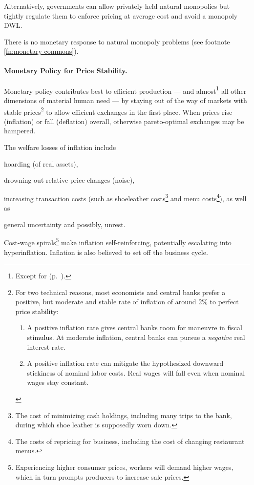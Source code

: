 Alternatively, governments can allow privately held natural monopolies but tightly regulate them to enforce pricing at average cost and avoid a monopoly \gls{DWL}.

There is no monetary response to natural monopoly problems (see footnote \ref{fn:monetary-commons}).

\paragraph{Monetary Policy for Price Stability.}  \label{sec:price-stability} Monetary policy contributes best to efficient production --- and almost\footnote{
	Except for  (p.~\pageref{sec:monetary-stimulus}).}
all other dimensions of material human need --- by staying out of the way of markets with stable prices\footnote{
	For two technical reasons, most economists and central banks prefer a positive, but moderate and stable rate of inflation of around 2\% to perfect price stability:
	\begin{enumerate}
		\item A positive inflation rate gives central banks room for maneuvre in fiscal stimulus. At moderate inflation, central banks can pursue a \emph{negative} real interest rate. 
		\item A positive inflation rate can mitigate the hypothesized downward stickiness of nominal labor costs. Real wages will fall even when nominal wages stay constant.%
	\end{enumerate}} 
to allow efficient exchanges in the first place. When prices rise (inflation) or fall (deflation) overall, otherwise pareto-optimal exchanges may be hampered. 

The welfare losses of inflation include \begin{inparaenum}
	\item hoarding (of real assets), 
	\item drowning out relative price changes (noise), 
	\item increasing transaction costs (such as shoeleather costs\footnote{
		The cost of minimizing cash holdings, including many trips to the bank, during which shoe leather is supposedly worn down.} 
		and menu costs\footnote{
			The costs of repricing for business, including the cost of changing restaurant menus.}), as well as 
	\item general uncertainty and possibly, unrest. 
	\end{inparaenum}
Cost-wage spirals\footnote{Experiencing higher consumer prices, workers will demand higher wages, which in turn prompts producers to increase sale prices.} make inflation self-reinforcing, potentially escalating into hyperinflation. Inflation is also believed to set off the business cycle. %

